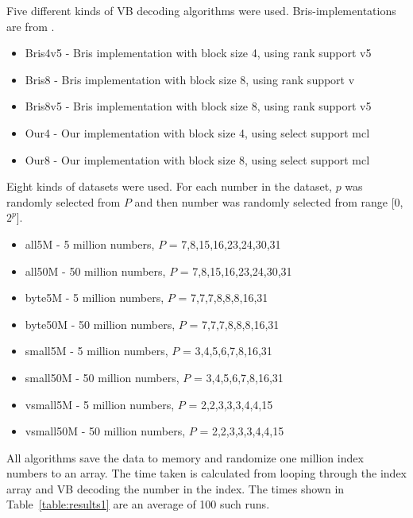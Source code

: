 Five different kinds of VB decoding algorithms were used. Bris-implementations are from \citep{Bri09}. 
\begin{itemize}
  \item Bris4v5 - Bris implementation with block size 4, using rank support v5
  \item Bris8 - Bris implementation with block size 8, using rank support v
  \item Bris8v5 - Bris implementation with block size 8, using rank support v5
  \item Our4 - Our implementation with block size 4, using select support mcl
  \item Our8 - Our implementation with block size 8, using select support mcl
\end{itemize}

Eight kinds of datasets were used. For each number in the dataset, $p$ was randomly selected from $P$ and then number was randomly selected from
range [0,$2^p$].

\begin{itemize}
  \item all5M - 5 million numbers, $P$ = {7,8,15,16,23,24,30,31}
  \item all50M - 50 million numbers, $P$ = {7,8,15,16,23,24,30,31}
  \item byte5M - 5 million numbers, $P$ = {7,7,7,8,8,8,16,31}
  \item byte50M - 50 million numbers, $P$ = {7,7,7,8,8,8,16,31}
  \item small5M - 5 million numbers, $P$ = {3,4,5,6,7,8,16,31}
  \item small50M - 50 million numbers, $P$ = {3,4,5,6,7,8,16,31}
  \item vsmall5M - 5 million numbers, $P$ = {2,2,3,3,3,4,4,15}
  \item vsmall50M - 50 million numbers, $P$ = {2,2,3,3,3,4,4,15}
\end{itemize}

All algorithms save the data to memory and randomize one million index numbers to an array. The time taken is calculated from looping through the 
index array and VB decoding the number in the index. The times shown in Table~\ref{table:results1} are an average of 100 such runs.

